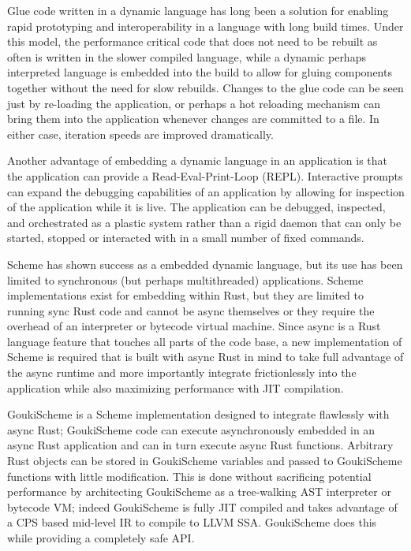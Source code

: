 \documentclass[sigplan]{acmart}
\begin{document}
Glue code written in a dynamic language has long been a solution for enabling
rapid prototyping and interoperability in a language with long build times. Under
this model, the performance critical code that does not need to be rebuilt as
often is written in the slower compiled language, while a dynamic perhaps
interpreted language is embedded into the build to allow for gluing components
together without the need for slow rebuilds. Changes to the glue code can be
seen just by re-loading the application, or perhaps a hot reloading mechanism
can bring them into the application whenever changes are committed to a file. In
either case, iteration speeds are improved dramatically.

Another advantage of embedding a dynamic language in an application is that the
application can provide a Read-Eval-Print-Loop (REPL). Interactive prompts can
expand the debugging capabilities of an application by allowing for inspection of
the application while it is live. The application can be debugged, inspected, and
orchestrated as a plastic system rather than a rigid daemon that can only be
started, stopped or interacted with in a small number of fixed commands.

Scheme has shown success as a embedded dynamic language, but its use has been
limited to synchronous (but perhaps multithreaded) applications. Scheme
implementations exist for embedding within Rust, but they are limited to running
sync Rust code and cannot be async themselves or they require the overhead of an
interpreter or bytecode virtual machine. Since async is a Rust language feature
that touches all parts of the code base, a new implementation of Scheme
is required that is built with async Rust in mind to take full advantage of the
async runtime and more importantly integrate frictionlessly into the application
while also maximizing performance with JIT compilation.

GoukiScheme \cite{gouki} is a Scheme implementation designed to integrate
flawlessly with async Rust; GoukiScheme code can execute asynchronously embedded
in an async Rust application and can in turn execute async Rust functions.
Arbitrary Rust objects can be stored in GoukiScheme variables and passed to
GoukiScheme functions with little modification. This is done without sacrificing
potential performance by architecting GoukiScheme as a tree-walking AST
interpreter or bytecode VM; indeed GoukiScheme is fully JIT compiled and takes
advantage of a CPS based mid-level IR to compile to LLVM SSA. GoukiScheme does
this while providing a completely safe API.
\end{document}

